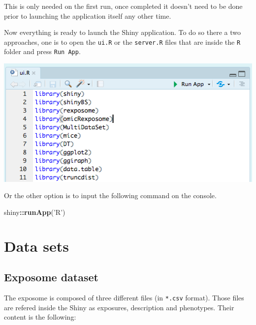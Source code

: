 \documentclass[
]{book}
\newenvironment{Shaded}{\begin{snugshade}}{\end{snugshade}}
\newcommand{\KeywordTok}[1]{\textcolor[rgb]{0.13,0.29,0.53}{\textbf{#1}}}
\newcommand{\NormalTok}[1]{#1}
\newcommand{\OperatorTok}[1]{\textcolor[rgb]{0.81,0.36,0.00}{\textbf{#1}}}
\newcommand{\StringTok}[1]{\textcolor[rgb]{0.31,0.60,0.02}{#1}}
\begin{document}
This is only needed on the first run, once completed it doesn't need to be done prior to launching the application itself any other time.

Now everything is ready to launch the Shiny application. To do so there a two approaches, one is to open the \texttt{ui.R} or the \texttt{server.R} files that are inside the \texttt{R} folder and press \texttt{Run\ App}.

\includegraphics{images/setup2.png}

Or the other option is to input the following command on the console.

\begin{Shaded}
\begin{Highlighting}[]
\NormalTok{shiny}\OperatorTok{::}\KeywordTok{runApp}\NormalTok{(}\StringTok{'R'}\NormalTok{)}
\end{Highlighting}
\end{Shaded}

\hypertarget{data-sets}{%
\chapter{Data sets}\label{data-sets}}

\hypertarget{exposome-dataset}{%
\section{Exposome dataset}\label{exposome-dataset}}

The exposome is composed of three different files (in \texttt{*.csv} format). Those files are refered inside the Shiny as exposures, description and phenotypes. Their content is the following:
\end{document}
